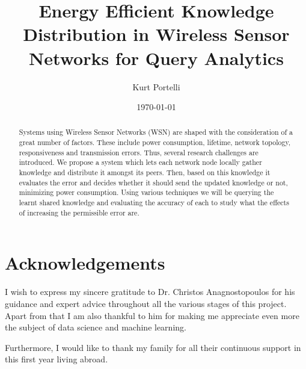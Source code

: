 \documentclass{mproj}
\begin{document}
\title{Energy Efficient Knowledge Distribution in Wireless Sensor Networks for Query Analytics}
\author{Kurt Portelli}
\date{\today}
\maketitle



\begin{abstract}
Systems using Wireless Sensor Networks (WSN) are shaped with the consideration of a great number of factors. These include power consumption, lifetime, network topology, responsiveness and transmission errors. Thus, several research challenges are introduced. We propose a system which lets each network node locally gather knowledge and distribute it amongst its peers. Then, based on this knowledge it evaluates the error and decides whether it should send the updated knowledge or not, minimizing power consumption. Using various techniques we will be querying the learnt shared knowledge and evaluating the accuracy of each to study what the effects of increasing the permissible error are.
\end{abstract}

\educationalconsent


\newpage
\section*{Acknowledgements}
I wish to express my sincere gratitude to Dr. Christos Anagnostopoulos for his guidance and expert advice throughout all the various stages of this project. Apart from that I am also thankful to him for making me appreciate even more the subject of data science and machine learning.

Furthermore, I would like to thank my family for all their continuous support in this first year living abroad. 


\tableofcontents
\end{document}
